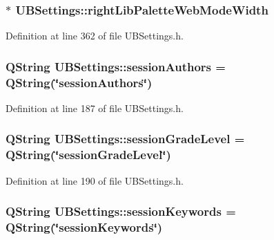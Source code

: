 \hypertarget{class_u_b_settings_a33295d163e4f9af2326a0b969b0fdcc4}{
\subsubsection[{right\-Lib\-Palette\-Web\-Mode\-Width}]{$\ast$ U\-B\-Settings\-::right\-Lib\-Palette\-Web\-Mode\-Width}}\label{db/d66/class_u_b_settings_a33295d163e4f9af2326a0b969b0fdcc4}


Definition at line 362 of file U\-B\-Settings.\-h.

\hypertarget{class_u_b_settings_a0b87a7cf69175a342007c69a14b74610}{
\subsubsection[{session\-Authors}]{\setlength{\rightskip}{0pt plus 5cm}Q\-String U\-B\-Settings\-::session\-Authors = Q\-String(\char`\"{}session\-Authors\char`\"{})\hspace{0.3cm}{\ttfamily [static]}}}\label{db/d66/class_u_b_settings_a0b87a7cf69175a342007c69a14b74610}


Definition at line 187 of file U\-B\-Settings.\-h.

\hypertarget{class_u_b_settings_aa487126d67dbcd67c98fb385fa31a28f}{
\subsubsection[{session\-Grade\-Level}]{\setlength{\rightskip}{0pt plus 5cm}Q\-String U\-B\-Settings\-::session\-Grade\-Level = Q\-String(\char`\"{}session\-Grade\-Level\char`\"{})\hspace{0.3cm}{\ttfamily [static]}}}\label{db/d66/class_u_b_settings_aa487126d67dbcd67c98fb385fa31a28f}


Definition at line 190 of file U\-B\-Settings.\-h.

\hypertarget{class_u_b_settings_a2512bb750de3636997d3198fee3648d6}{
\subsubsection[{session\-Keywords}]{\setlength{\rightskip}{0pt plus 5cm}Q\-String U\-B\-Settings\-::session\-Keywords = Q\-String(\char`\"{}session\-Keywords\char`\"{})\hspace{0.3cm}{\ttfamily [static]}}}\label{db/d66/class_u_b_settings_a2512bb750de3636997d3198fee3648d6}


